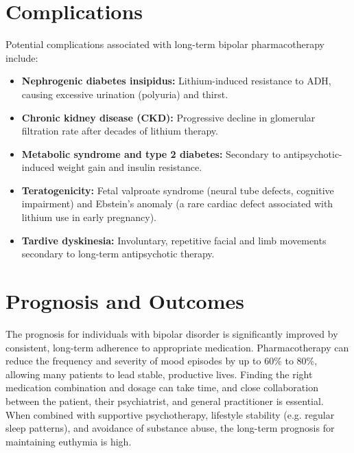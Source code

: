 \section*{Complications}
Potential complications associated with long-term bipolar pharmacotherapy include:
\begin{itemize}
    \item \textbf{Nephrogenic diabetes insipidus:} Lithium-induced resistance to ADH, causing excessive urination (polyuria) and thirst.
    \item \textbf{Chronic kidney disease (CKD):} Progressive decline in glomerular filtration rate after decades of lithium therapy.
    \item \textbf{Metabolic syndrome and type 2 diabetes:} Secondary to antipsychotic-induced weight gain and insulin resistance.
    \item \textbf{Teratogenicity:} Fetal valproate syndrome (neural tube defects, cognitive impairment) and Ebstein's anomaly (a rare cardiac defect associated with lithium use in early pregnancy).
    \item \textbf{Tardive dyskinesia:} Involuntary, repetitive facial and limb movements secondary to long-term antipsychotic therapy.
\end{itemize}

\section*{Prognosis and Outcomes}
The prognosis for individuals with bipolar disorder is significantly improved by consistent, long-term adherence to appropriate medication. Pharmacotherapy can reduce the frequency and severity of mood episodes by up to 60\% to 80\%, allowing many patients to lead stable, productive lives. Finding the right medication combination and dosage can take time, and close collaboration between the patient, their psychiatrist, and general practitioner is essential. When combined with supportive psychotherapy, lifestyle stability (e.g. regular sleep patterns), and avoidance of substance abuse, the long-term prognosis for maintaining euthymia is high.

